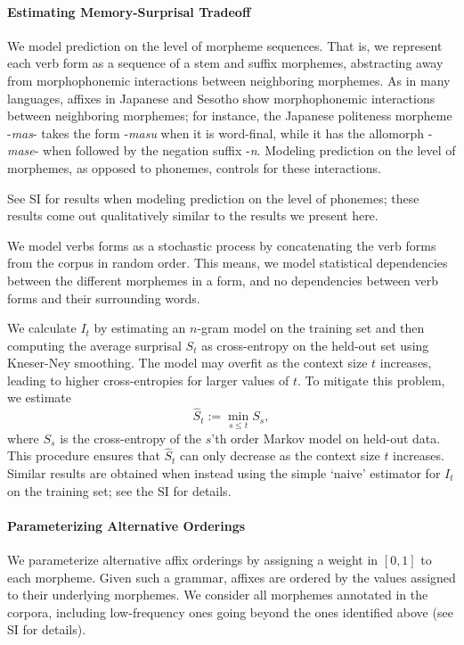 \paragraph{Estimating Memory-Surprisal Tradeoff}
We model prediction on the level of morpheme sequences.
That is, we represent each verb form as a sequence of a stem and suffix morphemes, abstracting away from morphophonemic interactions between neighboring morphemes.
As in many languages, affixes in Japanese and Sesotho show morphophonemic interactions between neighboring morphemes; for instance, the Japanese politeness morpheme -\textit{mas}- takes the form -\textit{masu} when it is word-final, while it has the allomorph -\textit{mase}- when followed by the negation suffix -\textit{n}.
Modeling prediction on the level of morphemes, as opposed to phonemes, controls for these interactions.


See SI for results when modeling prediction on the level of phonemes; these results come out qualitatively similar to the results we present here.


We model verbs forms as a stochastic process by concatenating the verb forms from the corpus in random order.
This means, we model statistical dependencies between the different morphemes in a form, and no dependencies between verb forms and their surrounding words.

We calculate $I_t$ by estimating an $n$-gram model on the training set and then computing the average surprisal $S_t$ as cross-entropy on the held-out set using Kneser-Ney smoothing.
The model may overfit as the context size $t$ increases, leading to higher cross-entropies for larger values of $t$.
To mitigate this problem, we estimate
\begin{equation}
\hat{S}_t := \min_{s \leq t} S_s,
\end{equation}
where $S_s$ is the cross-entropy of the $s$'th order Markov model on held-out data.
This procedure ensures that $\hat{S}_t$ can only decrease as the context size $t$ increases.
Similar results are obtained when instead using the simple `naive' estimator for $I_t$ on the training set; see the SI for details.

\paragraph{Parameterizing Alternative Orderings}

We parameterize alternative affix orderings by assigning a weight in $[0,1]$ to each morpheme.
Given such a grammar, affixes are ordered by the values assigned to their underlying morphemes.
We consider all morphemes annotated in the corpora, including low-frequency ones going beyond the ones identified above (see SI for details).

